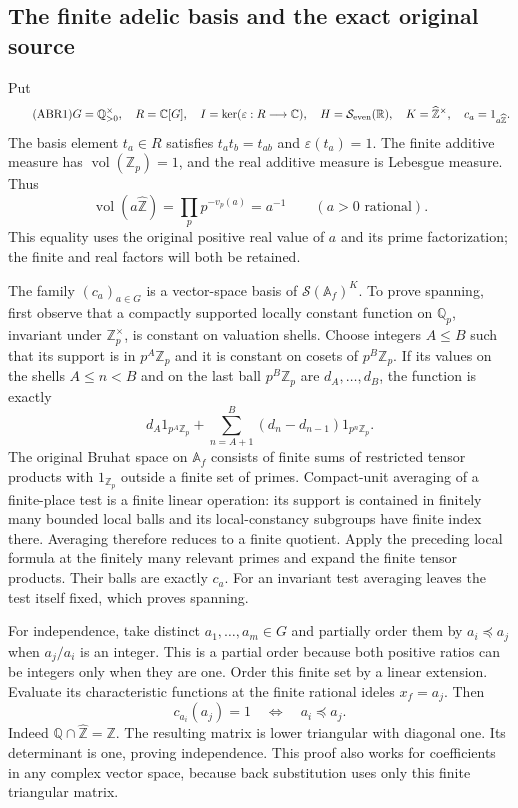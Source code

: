 \subsection{The finite adelic basis and the exact original source}

Put
\begin{equation}\tag{ABR1}
 G=\mathbb Q_{>0}^{\times},\quad R=\mathbb C[G],\quad
 I=\ker(\varepsilon:R\longrightarrow\mathbb C),\quad
 H=\mathcal S_{\rm even}(\mathbb R),\quad
 K=\widehat{\mathbb Z}^{\times},\quad c_a=1_{a\widehat{\mathbb Z}}.
\end{equation}
The basis element $t_a\in R$ satisfies $t_at_b=t_{ab}$ and
$\varepsilon(t_a)=1$. The finite additive measure has
$\operatorname{vol}(\mathbb Z_p)=1$, and the real additive measure
is Lebesgue measure. Thus
\begin{equation}\tag{ABR2}
 \operatorname{vol}(a\widehat{\mathbb Z})
  =\prod_p p^{-v_p(a)}=a^{-1}\qquad(a>0\text{ rational}).
\end{equation}
This equality uses the original positive real value of $a$ and its
prime factorization; the finite and real factors will both be retained.

The family $(c_a)_{a\in G}$ is a vector-space basis of
$\mathcal S(\mathbb A_f)^K$. To prove spanning, first observe that a
compactly supported locally constant function on $\mathbb Q_p$,
invariant under $\mathbb Z_p^\times$, is constant on valuation shells.
Choose integers $A\le B$ such that its support is in $p^A\mathbb Z_p$
and it is constant on cosets of $p^B\mathbb Z_p$. If its values on
the shells $A\le n<B$ and on the last ball $p^B\mathbb Z_p$ are
$d_A,\ldots,d_B$, the function is exactly
\[
 d_A1_{p^A\mathbb Z_p}
 +\sum_{n=A+1}^{B}(d_n-d_{n-1})1_{p^n\mathbb Z_p}.
\]
The original Bruhat space on $\mathbb A_f$ consists of finite sums
of restricted tensor products with $1_{\mathbb Z_p}$ outside a finite
set of primes. Compact-unit averaging of a finite-place test is a
finite linear operation: its support is contained in finitely many
bounded local balls and its local-constancy subgroups have finite
index there. Averaging therefore reduces to a finite quotient. Apply
the preceding local formula at the finitely many relevant primes and
expand the finite tensor products. Their balls are exactly $c_a$.
For an invariant test averaging leaves the test itself fixed, which
proves spanning.

For independence, take distinct $a_1,\ldots,a_m\in G$ and partially
order them by $a_i\preceq a_j$ when $a_j/a_i$ is an integer. This is
a partial order because both positive ratios can be integers only
when they are one. Order this finite set by a linear extension.
Evaluate its characteristic functions at the finite rational ideles
$x_f=a_j$. Then
\[
 c_{a_i}(a_j)=1\quad\Longleftrightarrow\quad a_i\preceq a_j.
\]
Indeed $\mathbb Q\cap\widehat{\mathbb Z}=\mathbb Z$.
The resulting matrix is lower triangular with diagonal one. Its
determinant is one, proving independence. This proof also works for
coefficients in any complex vector space, because back substitution
uses only this finite triangular matrix.

